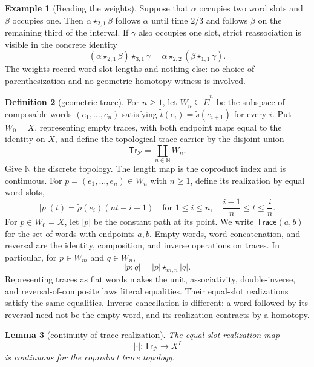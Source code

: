 \documentclass[10pt,reqno]{amsart}
\theoremstyle{definition}
\newtheorem{definition}{Definition}[section]
\newtheorem{example}[definition]{Example}
\theoremstyle{plain}
\newtheorem{lemma}[definition]{Lemma}
\theoremstyle{remark}
\newcommand{\Trace}{\mathsf{Trace}}
\newcommand{\N}{\mathbb N}
\begin{document}
\begin{example}[Reading the weights]
Suppose that $\alpha$ occupies two word slots and $\beta$ occupies one.
Then $\alpha\star_{2,1}\beta$ follows $\alpha$ until time $2/3$ and
follows $\beta$ on the remaining third of the interval.  If $\gamma$ also
occupies one slot, strict reassociation is visible in the concrete identity
\[
  (\alpha\star_{2,1}\beta)\star_{3,1}\gamma
  =\alpha\star_{2,2}(\beta\star_{1,1}\gamma).
\]
The weights record word-slot lengths and nothing else: no choice of
parenthesization and no geometric homotopy witness is involved.
\end{example}

\begin{definition}[geometric trace]
For $n\geq 1$, let $W_n\subseteq\widetilde E^n$ be the subspace of composable
words $(e_1,\ldots,e_n)$ satisfying
\(\widetilde t(e_i)=\widetilde s(e_{i+1})\) for every $i$.  Put $W_0=X$, representing empty traces,
with both endpoint maps equal to the identity on $X$, and define the
topological trace carrier by the disjoint union
\[
  \mathsf{Tr}_{\mathcal P}=\coprod_{n\in\N}W_n.
\]
Give $\N$ the discrete topology.  The length map is the coproduct index and
is continuous.  For $p=(e_1,\ldots,e_n)\in W_n$ with
$n\geq1$, define its realization by equal word slots,
\[
 |p|(t)=\widetilde\rho(e_i)(nt-i+1)
 \quad\text{for }1\leq i\leq n,\quad
 \frac{i-1}{n}\leq t\leq\frac{i}{n}.
\]
For $p\in W_0=X$, let $|p|$ be the constant path at its point.  We write
\(\Trace(a,b)\) for the set of words with endpoints $a,b$.  Empty words, word
concatenation, and reversal are the identity, composition, and inverse
operations on traces.  In particular, for $p\in W_m$ and
$q\in W_n$,
\[
 |p;q|=|p|\star_{m,n}|q|.
\]
Representing traces as flat words makes the unit, associativity,
double-inverse, and reversal-of-composite laws literal equalities.
Their equal-slot realizations satisfy the same equalities.
Inverse cancellation is different: a word followed by its reversal need
not be the empty word, and its realization contracts by a homotopy.

\end{definition}

\begin{lemma}[continuity of trace realization]
\label{lem:trace-realization-continuous}
The equal-slot realization map
\[
  |\cdot|:\mathsf{Tr}_{\mathcal P}\longrightarrow X^I
\]
is continuous for the coproduct trace topology.
\end{lemma}
\end{document}
